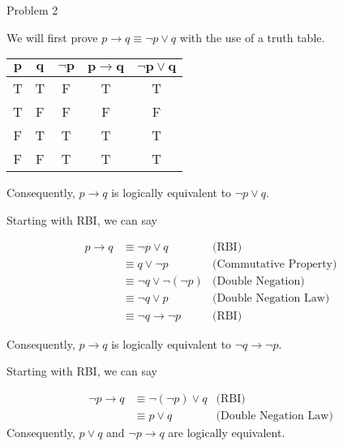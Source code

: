 \begin{problem}{Problem 2}
    \begin{highlight}
        We will first prove $p \rightarrow q \equiv \neg p \vee q$ with the use of a truth table.

        \begin{center}
            \begin{tabular}[h]{|c|c|c|c|c|}
                \hline $\mathbf{p}$ & $\mathbf{q}$ & $\mathbf{\neg p}$ & $\mathbf{p \rightarrow q}$ & $\mathbf{\neg p \vee q}$ \\ \hline
                T & T & F & T & T \\ \hline
                T & F & F & F & F \\ \hline
                F & T & T & T & T \\ \hline
                F & F & T & T & T \\ \hline
            \end{tabular}
        \end{center}
        Consequently, $p \rightarrow q$ is logically equivalent to $\neg p \vee q$.
    \end{highlight}

    \begin{highlight}
        Starting with RBI, we can say

        \begin{align*}
            p \rightarrow q & \equiv \neg p \vee q & \text{(RBI)} \\
            & \equiv q \vee \neg p & \text{(Commutative Property)} \\
            & \equiv \neg q \vee \neg (\neg p) & \text{(Double Negation)} \\
            & \equiv \neg q \vee p & \text{(Double Negation Law)} \\
            & \equiv \neg q \rightarrow \neg p & \text{(RBI)}
        \end{align*}

        Consequently, $p \rightarrow q$ is logically equivalent to $\neg q \rightarrow \neg p$.
    \end{highlight}

    \begin{highlight}
        Starting with RBI, we can say

        \begin{align*}
            \neg p \rightarrow q & \equiv \neg(\neg p) \vee q & \text{(RBI)} \\
            & \equiv p \vee q & \text{(Double Negation Law)}
        \end{align*}
        Consequently, $p \vee q$ and $\neg p \rightarrow q$ are logically equivalent.
    \end{highlight}


\end{problem}
